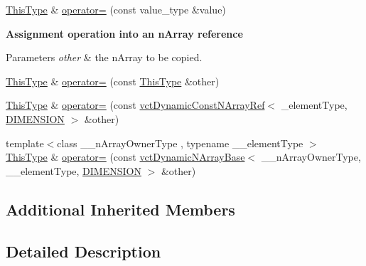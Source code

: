 \begin{DoxyCompactItemize}
\item 
\hyperlink{classvct_dynamic_n_array_ref_a157266ffe0ad737f4df13dcf499a4494}{This\+Type} \& \hyperlink{classvct_dynamic_n_array_ref_a8fca22e4d48e70c120d3ef2c4a09b641}{operator=} (const value\+\_\+type \&value)
\end{DoxyCompactItemize}
\begin{Indent}{\bf Assignment operation into an n\+Array reference}\par
{\em 
\begin{DoxyParams}{Parameters}
{\em other} & the n\+Array to be copied. \\
\hline
\end{DoxyParams}
}\begin{DoxyCompactItemize}
\item 
\hyperlink{classvct_dynamic_n_array_ref_a157266ffe0ad737f4df13dcf499a4494}{This\+Type} \& \hyperlink{classvct_dynamic_n_array_ref_ad5f88bdb7321149e4e04a88e2816d3e9}{operator=} (const \hyperlink{classvct_dynamic_n_array_ref_a157266ffe0ad737f4df13dcf499a4494}{This\+Type} \&other)
\item 
\hyperlink{classvct_dynamic_n_array_ref_a157266ffe0ad737f4df13dcf499a4494}{This\+Type} \& \hyperlink{classvct_dynamic_n_array_ref_ad895d2b6e63062664036f3e7fadffdc0}{operator=} (const \hyperlink{classvct_dynamic_const_n_array_ref}{vct\+Dynamic\+Const\+N\+Array\+Ref}$<$ \+\_\+element\+Type, \hyperlink{group__cisst_vector_gga92161a3e7a42576d3442eaf7bae097c1aa639cdab72a595c9cb324af98946bab5}{D\+I\+M\+E\+N\+S\+I\+O\+N} $>$ \&other)
\item 
{\footnotesize template$<$class \+\_\+\+\_\+n\+Array\+Owner\+Type , typename \+\_\+\+\_\+element\+Type $>$ }\\\hyperlink{classvct_dynamic_n_array_ref_a157266ffe0ad737f4df13dcf499a4494}{This\+Type} \& \hyperlink{classvct_dynamic_n_array_ref_a589dd9b7637924042ed4f45176afd9f8}{operator=} (const \hyperlink{classvct_dynamic_n_array_base}{vct\+Dynamic\+N\+Array\+Base}$<$ \+\_\+\+\_\+n\+Array\+Owner\+Type, \+\_\+\+\_\+element\+Type, \hyperlink{group__cisst_vector_gga92161a3e7a42576d3442eaf7bae097c1aa639cdab72a595c9cb324af98946bab5}{D\+I\+M\+E\+N\+S\+I\+O\+N} $>$ \&other)
\end{DoxyCompactItemize}
\end{Indent}
\subsection*{Additional Inherited Members}


\subsection{Detailed Description}
